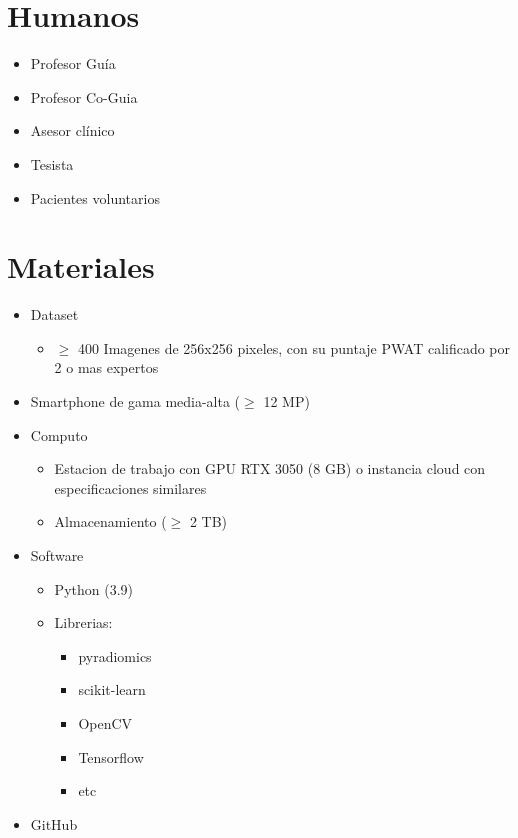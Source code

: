 \section{Humanos}

\begin{itemize}
\item Profesor Guía
\item Profesor Co-Guia
\item Asesor clínico
\item Tesista
\item Pacientes voluntarios
\end{itemize}

\section{Materiales}

\begin{itemize}
\item Dataset
\begin{itemize}
    \item \(\ge\) 400 Imagenes de 256x256 pixeles, con su puntaje PWAT calificado por 2 o mas expertos
\end{itemize}
\item Smartphone de gama media-alta (\(\ge\) 12 MP)
\item Computo
\begin{itemize}
    \item Estacion de trabajo con GPU RTX 3050 (8 GB) o instancia cloud con especificaciones similares
    \item Almacenamiento (\(\ge\) 2 TB)
\end{itemize}
\item Software 
\begin{itemize}
    \item Python (3.9)
    \item Librerias:
    \begin{itemize}
        \item pyradiomics
        \item scikit-learn
        \item OpenCV
        \item Tensorflow
        \item etc
    \end{itemize}
\end{itemize}
\item GitHub
\end{itemize}